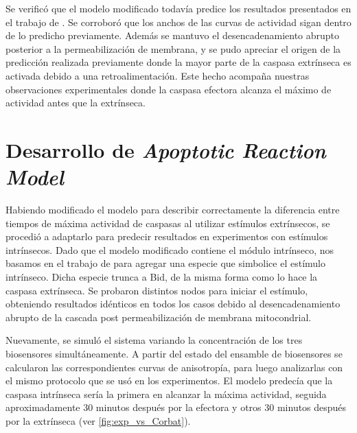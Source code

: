 Se verificó que el modelo modificado todavía predice los resultados presentados en el trabajo de \cite{Albeck2008}. Se corroboró que los anchos de las curvas de actividad sigan dentro de lo predicho previamente. Además se mantuvo el desencadenamiento abrupto posterior a la permeabilización de membrana, y se pudo apreciar el origen de la predicción realizada previamente donde la mayor parte de la caspasa extrínseca es activada debido a una retroalimentación. Este hecho acompaña nuestras observaciones experimentales donde la caspasa efectora alcanza el máximo de actividad antes que la extrínseca.


\section{Desarrollo de \textit{Apoptotic Reaction Model}}


Habiendo modificado el modelo para describir correctamente la diferencia entre tiempos de máxima actividad de caspasas al utilizar estímulos extrínsecos, se procedió a adaptarlo para predecir resultados en experimentos con estímulos intrínsecos. Dado que el modelo modificado contiene el módulo intrínseco, nos basamos en el trabajo de \cite{Zhang2009} para agregar una especie que simbolice el estímulo intrínseco. Dicha especie trunca a Bid, de la misma forma como lo hace la caspasa extrínseca. Se probaron distintos nodos para iniciar el estímulo, obteniendo resultados idénticos en todos los casos debido al desencadenamiento abrupto de la cascada post permeabilización de membrana mitocondrial.

Nuevamente, se simuló el sistema variando la concentración de los tres biosensores simultáneamente. A partir del estado del ensamble de biosensores se calcularon las correspondientes curvas de anisotropía, para luego analizarlas con el mismo protocolo que se usó en los experimentos. El modelo predecía que la caspasa intrínseca sería la primera en alcanzar la máxima actividad, seguida aproximadamente 30 minutos después por la efectora y otros 30 minutos después por la extrínseca (ver \cref{fig:exp_vs_Corbat}).

